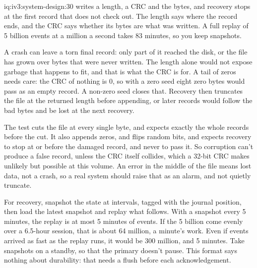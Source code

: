 \begin{solution}{iq:iv3:system-design:30}
 writes a length, a CRC and the bytes, and recovery stops at the first record that does not check out. The length says where the record ends, and the CRC says whether its bytes are what was written. A full replay of 5 billion events at a million a second takes 83 minutes, so you keep snapshots.
\label{lst:iv3:sd:journal}

A crash can leave a torn final record: only part of it reached the disk, or the file has grown over bytes that were never written. The length alone would not expose garbage that happens to fit, and that is what the CRC is for. A tail of zeros needs care: the CRC of nothing is 0, so with a zero seed eight zero bytes would pass as an empty record. A non-zero seed closes that. Recovery then truncates the file at the returned length before appending, or later records would follow the bad bytes and be lost at the next recovery.

The test cuts the file at every single byte, and expects exactly the whole records before the cut. It also appends zeros, and flips random bits, and expects recovery to stop at or before the damaged record, and never to pass it. So corruption can't produce a false record, unless the CRC itself collides, which a 32-bit CRC makes unlikely but possible at this volume. An error in the middle of the file means lost data, not a crash, so a real system should raise that as an alarm, and not quietly truncate.

For recovery, snapshot the state at intervals, tagged with the journal position, then load the latest snapshot and replay what follows. With a snapshot every 5 minutes, the replay is at most 5 minutes of events. If the 5 billion come evenly over a 6.5-hour session, that is about 64 million, a minute's work. Even if events arrived as fast as the replay runs, it would be 300 million, and 5 minutes. Take snapshots on a standby, so that the primary doesn't pause. This format says nothing about durability: that needs a flush before each acknowledgement.

\end{solution}

